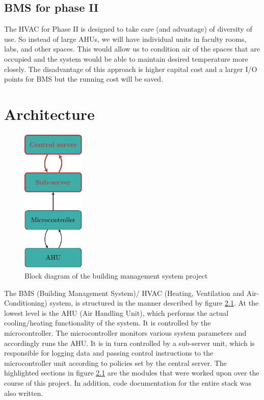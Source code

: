 \documentclass[letterpaper,11pt]{report}
\begin{document}
\section{BMS for phase II}
The HVAC for Phase II is designed to take care (and advantage) of diversity of use. So instead of large AHUs, we will have individual units in faculty rooms, labs, and other spaces. This would allow us to condition air of the spaces that are occupied and the system would be able to maintain desired temperature more closely. The disadvantage of this approach is higher capital cost and a larger I/O points for BMS but the running cost will be saved.

\newpage
\chapter{Architecture}\label{chapter:architecture}
\onehalfspacing
\begin{figure}[h]
\includegraphics[width=3cm, height=7cm]{arch}
\centering
\captionsetup{justification=centering}
\caption{Block diagram of the building management system project}
\label{fig:arch}
\end{figure}
The BMS (Building Management System)/ HVAC (Heating, Ventilation and Air-Conditioning) system, is structured in the manner described by figure \ref{fig:arch}. At the lowest level is the AHU (Air Handling Unit), which performs the actual cooling/heating functionality of the system. It is controlled by the microcontroller. The microcontroller monitors various system parameters and accordingly runs the AHU. It is in turn controlled by a sub-server unit, which is responsible for logging data and passing control instructions to the microcontroller unit according to policies set by the central server. The highlighted sections in figure \ref{fig:arch} are the modules that were worked upon over the course of this project. In addition, code documentation for the entire stack was also written.
\end{document}
